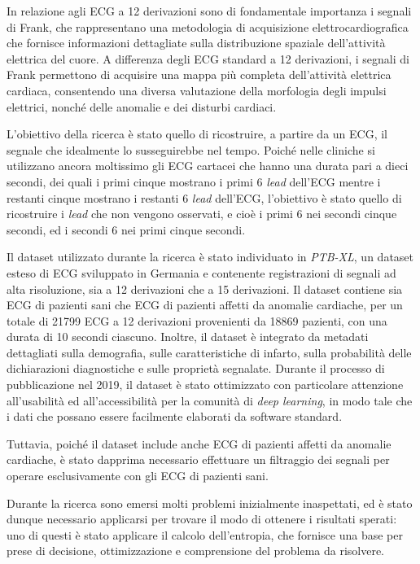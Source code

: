 \documentclass[12pt,italian]{report}
\begin{document}
In relazione agli ECG a 12 derivazioni sono di fondamentale importanza i segnali di Frank, che rappresentano una metodologia di acquisizione elettrocardiografica che fornisce informazioni dettagliate sulla distribuzione spaziale dell'attività elettrica del cuore. A differenza degli ECG standard a 12 derivazioni, i segnali di Frank permettono di acquisire una mappa più completa dell'attività elettrica cardiaca, consentendo una diversa valutazione della morfologia degli impulsi elettrici, nonché delle anomalie e dei disturbi cardiaci.

L'obiettivo della ricerca è stato quello di ricostruire, a partire da un ECG, il segnale che idealmente lo susseguirebbe nel tempo. Poiché nelle cliniche si utilizzano ancora moltissimo gli ECG cartacei che hanno una durata pari a dieci secondi, dei quali i primi cinque mostrano i primi 6 \textit{lead} dell'ECG mentre i restanti cinque mostrano i restanti 6 \textit{lead} dell'ECG, l'obiettivo è stato quello di ricostruire i \textit{lead} che non vengono osservati, e cioè i primi 6 nei secondi cinque secondi, ed i secondi 6 nei primi cinque secondi.

Il dataset utilizzato durante la ricerca è stato individuato in \textit{PTB-XL}, un dataset esteso di ECG sviluppato in Germania e contenente registrazioni di segnali ad alta risoluzione, sia a 12 derivazioni che a 15 derivazioni. Il dataset contiene sia ECG di pazienti sani che ECG di pazienti affetti da anomalie cardiache, per un totale di 21799 ECG a 12 derivazioni provenienti da 18869 pazienti, con una durata di 10 secondi ciascuno. Inoltre, il dataset è integrato da metadati dettagliati sulla demografia, sulle caratteristiche di infarto, sulla probabilità delle dichiarazioni diagnostiche e sulle proprietà segnalate. Durante il processo di pubblicazione nel 2019, il dataset è stato ottimizzato con particolare attenzione all'usabilità ed all'accessibilità per la comunità di \textit{deep learning}, in modo tale che i dati che possano essere facilmente elaborati da software standard.

Tuttavia, poiché il dataset include anche ECG di pazienti affetti da anomalie cardiache, è stato dapprima necessario effettuare un filtraggio dei segnali per operare esclusivamente con gli ECG di pazienti sani.

Durante la ricerca sono emersi molti problemi inizialmente inaspettati, ed è stato dunque necessario applicarsi per trovare il modo di ottenere i risultati sperati: uno di questi è stato applicare il calcolo dell'entropia, che fornisce una base per prese di decisione, ottimizzazione e comprensione del problema da risolvere.
\end{document}
